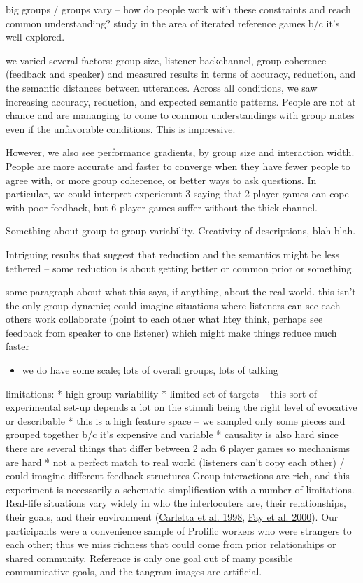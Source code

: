 \documentclass[
  english,
  a4paper,
]{article}
\providecommand{\tightlist}{%
  \setlength{\itemsep}{0pt}\setlength{\parskip}{0pt}}
\begin{document}
big groups / groups vary -- how do people work with these constraints and reach common understanding? study in the area of iterated reference games b/c it's well explored.

we varied several factors: group size, listener backchannel, group coherence (feedback and speaker) and measured results in terms of accuracy, reduction, and the semantic distances between utterances. Across all conditions, we saw increasing accuracy, reduction, and expected semantic patterns. People are not at chance and are mananging to come to common understandings with group mates even if the unfavorable conditions. This is impressive.

However, we also see performance gradients, by group size and interaction width. People are more accurate and faster to converge when they have fewer people to agree with, or more group coherence, or better ways to ask questions. In particular, we could interpret experiemnt 3 saying that 2 player games can cope with poor feedback, but 6 player games suffer without the thick channel.

Something about group to group variability. Creativity of descriptions, blah blah.

Intriguing results that suggest that reduction and the semantics might be less tethered -- some reduction is about getting better or common prior or something.

some paragraph about what this says, if anything, about the real world. this isn't the only group dynamic; could imagine situations where listeners can see each others work collaborate (point to each other what htey think, perhaps see feedback from speaker to one listener) which might make things reduce much faster

\begin{itemize}
\tightlist
\item
  we do have some scale; lots of overall groups, lots of talking
\end{itemize}

limitations:
* high group variability
* limited set of targets -- this sort of experimental set-up depends a lot on the stimuli being the right level of evocative or describable
* this is a high feature space -- we sampled only some pieces and grouped together b/c it's expensive and variable
* causality is also hard since there are several things that differ between 2 adn 6 player games so mechanisms are hard
* not a perfect match to real world (listeners can't copy each other) / could imagine different feedback structures
Group interactions are rich, and this experiment is necessarily a schematic simplification with a number of limitations. Real-life situations vary widely in who the interlocuters are, their relationships, their goals, and their environment (\protect\hyperlink{ref-carletta1998}{Carletta et al. 1998}, \protect\hyperlink{ref-fay2000}{Fay et al. 2000}). Our participants were a convenience sample of Prolific workers who were strangers to each other; thus we miss richness that could come from prior relationships or shared community. Reference is only one goal out of many possible communicative goals, and the tangram images are artificial.
\end{document}

